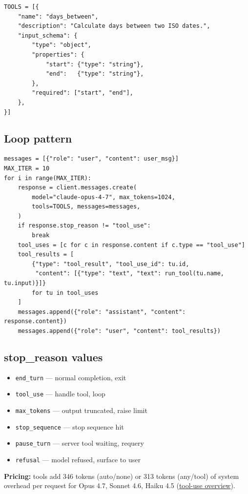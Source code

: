 \documentclass[11pt,a4paper]{article}
\begin{document}
\begin{lstlisting}[language=python2]
TOOLS = [{
    "name": "days_between",
    "description": "Calculate days between two ISO dates.",
    "input_schema": {
        "type": "object",
        "properties": {
            "start": {"type": "string"},
            "end":   {"type": "string"},
        },
        "required": ["start", "end"],
    },
}]
\end{lstlisting}

\subsection{Loop pattern}

\begin{lstlisting}[language=python2]
messages = [{"role": "user", "content": user_msg}]
MAX_ITER = 10
for i in range(MAX_ITER):
    response = client.messages.create(
        model="claude-opus-4-7", max_tokens=1024,
        tools=TOOLS, messages=messages,
    )
    if response.stop_reason != "tool_use":
        break
    tool_uses = [c for c in response.content if c.type == "tool_use"]
    tool_results = [
        {"type": "tool_result", "tool_use_id": tu.id,
         "content": [{"type": "text", "text": run_tool(tu.name, tu.input)}]}
        for tu in tool_uses
    ]
    messages.append({"role": "assistant", "content": response.content})
    messages.append({"role": "user", "content": tool_results})
\end{lstlisting}

\subsection{stop\_reason values}

\begin{itemize}
\item \texttt{end\_turn} --- normal completion, exit
\item \texttt{tool\_use} --- handle tool, loop
\item \texttt{max\_tokens} --- output truncated, raise limit
\item \texttt{stop\_sequence} --- stop sequence hit
\item \texttt{pause\_turn} --- server tool waiting, requery
\item \texttt{refusal} --- model refused, surface to user
\end{itemize}

\textbf{Pricing:} tools add 346 tokens (auto/none) or 313 tokens (any/tool) of system overhead per request for Opus 4.7, Sonnet 4.6, Haiku 4.5 (\href{https://docs.claude.com/en/agents-and-tools/tool-use/overview}{tool-use overview}).
\end{document}
